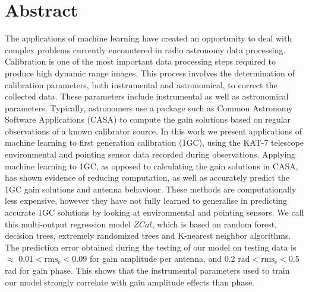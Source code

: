 \chapter*{Abstract} 

The applications of machine learning have created an opportunity to deal with complex problems currently encountered in radio astronomy data processing. Calibration is one of the most important data processing steps required to produce high dynamic range images. This process involves the determination of calibration parameters, both instrumental and astronomical, to correct the
collected data. These parameters include instrumental as well as astronomical parameters. Typically, astronomers use a package such as Common Astronomy Software Applications (CASA) to compute the gain solutions based on regular observations of a known calibrator source. In this work we present applications of machine learning to first generation calibration (1GC), using the KAT-7 telescope environmental and pointing sensor data recorded during observations. Applying machine learning to 1GC, as opposed to calculating the gain solutions in CASA, has shown evidence of reducing computation, as well as accurately predict the 1GC gain solutions and antenna behaviour. These methods are computationally less expensive, however they have not fully learned to generalise  in predicting  accurate 1GC solutions by looking at environmental and pointing sensors. We call this multi-output regression model $\textit{ZCal}$, which is based on random forest, decision trees, extremely randomized trees and K-nearest neighbor algorithms. The prediction error obtained during the testing of our model on testing data is $\approx$ $0.01< \mathrm{rms}_\mathrm{e} <0.09$ for gain amplitude per antenna, and 0.2 $\mathrm{rad}< \mathrm{rms}_\mathrm{e}<$0.5 $\mathrm{rad}$ for gain phase. This shows that the instrumental parameters used to train our model strongly correlate with gain amplitude effects than phase.  


